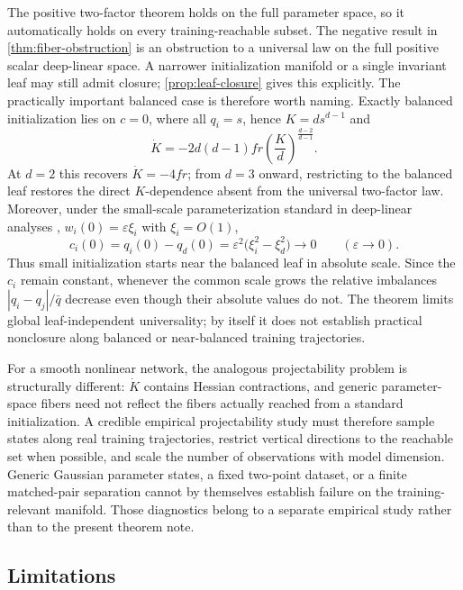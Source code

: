 The positive two-factor theorem holds on the full parameter space, so it automatically holds on every training-reachable subset.  The negative result in \cref{thm:fiber-obstruction} is an obstruction to a universal law on the full positive scalar deep-linear space.  A narrower initialization manifold or a single invariant leaf may still admit closure; \cref{prop:leaf-closure} gives this explicitly.  The practically important balanced case is therefore worth naming.  Exactly balanced initialization lies on $c=0$, where all $q_i=s$, hence $K=d s^{d-1}$ and
\[
  \dot K=-2d(d-1)fr\left(\frac{K}{d}\right)^{\frac{d-2}{d-1}}.
\]
At $d=2$ this recovers $\dot K=-4fr$; from $d=3$ onward, restricting to the balanced leaf restores the direct $K$-dependence absent from the universal two-factor law.  Moreover, under the small-scale parameterization standard in deep-linear analyses \citep{saxe2014deep,arora2018optimization,du2018balanced}, $w_i(0)=\varepsilon\xi_i$ with $\xi_i=O(1)$,
\begin{equation}
  c_i(0)=q_i(0)-q_d(0)
  =\varepsilon^2\bigl(\xi_i^2-\xi_d^2\bigr)\longrightarrow0
  \qquad (\varepsilon\to0).
  \label{eq:near-balanced-initialization}
\end{equation}
Thus small initialization starts near the balanced leaf in absolute scale.  Since the $c_i$ remain constant, whenever the common scale grows the relative imbalances $|q_i-q_j|/\bar q$ decrease even though their absolute values do not.  The theorem limits global leaf-independent universality; by itself it does not establish practical nonclosure along balanced or near-balanced training trajectories.

For a smooth nonlinear network, the analogous projectability problem is structurally different: $\dot K$ contains Hessian contractions, and generic parameter-space fibers need not reflect the fibers actually reached from a standard initialization.  A credible empirical projectability study must therefore sample states along real training trajectories, restrict vertical directions to the reachable set when possible, and scale the number of observations with model dimension.  Generic Gaussian parameter states, a fixed two-point dataset, or a finite matched-pair separation cannot by themselves establish failure on the training-relevant manifold.  Those diagnostics belong to a separate empirical study rather than to the present theorem note.

\subsection{Limitations}

